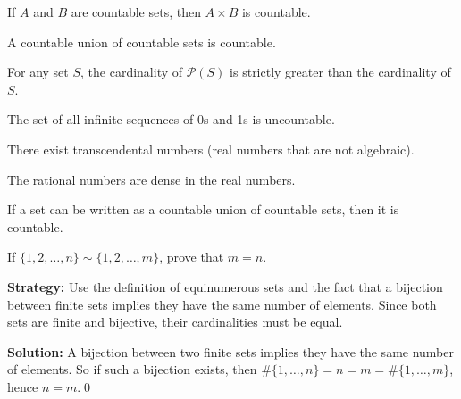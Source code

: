 \begin{theorem}
If $A$ and $B$ are countable sets, then $A \times B$ is countable.
\end{theorem}

\begin{theorem}
A countable union of countable sets is countable.
\end{theorem}

\begin{theorem}
For any set $S$, the cardinality of $\mathcal{P}(S)$ is strictly greater than the cardinality of $S$.
\end{theorem}

\begin{theorem}
The set of all infinite sequences of 0s and 1s is uncountable.
\end{theorem}

\begin{theorem}
There exist transcendental numbers (real numbers that are not algebraic).
\end{theorem}

\begin{theorem}
The rational numbers are dense in the real numbers.
\end{theorem}

\begin{theorem}
If a set can be written as a countable union of countable sets, then it is countable.
\end{theorem}



\begin{problembox}
If \( \{1, 2, \ldots, n\} \sim \{1, 2, \ldots, m\} \), prove that \( m = n \).
\end{problembox}

\noindent\textbf{Strategy:} Use the definition of equinumerous sets and the fact that a bijection between finite sets implies they have the same number of elements. Since both sets are finite and bijective, their cardinalities must be equal.

\noindent\bigskip\noindent\textbf{Solution:}  
A bijection between two finite sets implies they have the same number of elements.  
So if such a bijection exists, then $\#\{1, \ldots, n\} = n = m = \#\{1, \ldots, m\}$, hence $n = m$.\qed



